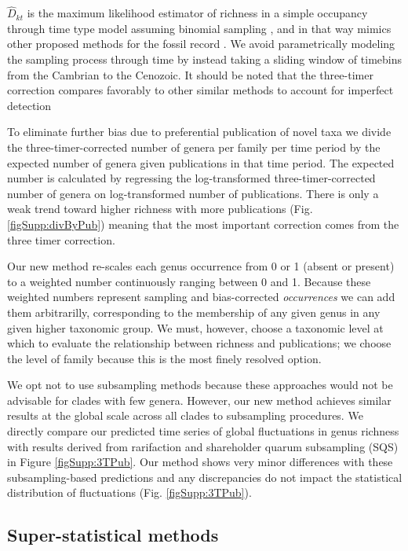 \documentclass[12pt]{article}
\let\citep=\cite
\begin{document}
$\hat{D}_{kt}$ is the maximum likelihood estimator of richness in a
simple occupancy through time type model assuming binomial sampling
\citep{royleDorazio}, and in that way mimics other proposed methods
for the fossil record \citep{foote2016, starrfelt2016}. We avoid
parametrically modeling the sampling process through time by instead
taking a sliding window of timebins from the Cambrian to the
Cenozoic. It should be noted that the three-timer correction compares
favorably to other similar methods to account for imperfect detection
\citep{alroy2014}

To eliminate further bias due to preferential publication of novel
taxa \citep{alroy2010} we divide the three-timer-corrected number of
genera per family per time period by the expected number of genera
given publications in that time period.  The expected number is
calculated by regressing the log-transformed three-timer-corrected
number of genera on log-transformed number of publications. There is
only a weak trend toward higher richness with more publications
(Fig. \ref{figSupp:divByPub}) meaning that the most important correction
comes from the three timer correction.

Our new method re-scales each genus occurrence from 0 or 1 (absent or
present) to a weighted number continuously ranging between 0 and
1. Because these weighted numbers represent sampling and
bias-corrected {\it occurrences} we can add them arbitrarilly,
corresponding to the membership of any given genus in any given higher
taxonomic group.  We must, however, choose a taxonomic level at which
to evaluate the relationship between richness and publications; we
choose the level of family because this is the most finely resolved
option.

We opt not to use subsampling methods \citep{miller1996, alroy2010,
  kocsis2018} because these approaches would not be advisable for
clades with few genera. However, our new method achieves similar
results at the global scale across all clades to subsampling
procedures. We directly compare our predicted time series of global
fluctuations in genus richness with results derived from rarifaction
and shareholder quarum subsampling (SQS) in Figure
\ref{figSupp:3TPub}.  Our method shows very minor differences with
these subsampling-based predictions and any discrepancies do not
impact the statistical distribution of fluctuations
(Fig. \ref{figSupp:3TPub}).


\subsection{Super-statistical methods} \label{sec:numMeth}
\end{document}
